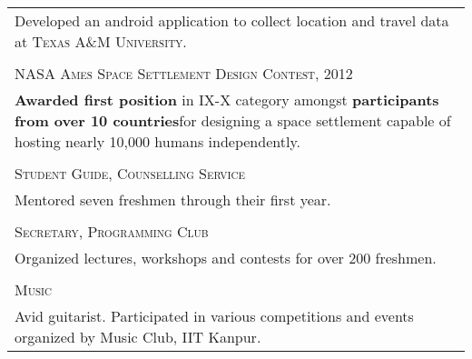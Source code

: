 \documentclass[a4paper,10pt]{article}
\begin{document}
\begin{longtable}{p{16cm}}
Developed an android application to collect location and travel data at \textsc{Texas A\&M University}. \\ \\
\large \textsc{NASA Ames Space Settlement Design Contest, 2012}\\
\textbf{Awarded first position} in IX-X category amongst \textbf{participants from over 10 countries}for designing a space settlement capable of hosting nearly 10,000 humans independently.\\ \\
\large \textsc{Student Guide, Counselling Service}\\
Mentored seven freshmen through their first year.\\ \\
\large \textsc{Secretary, Programming Club}\\
Organized lectures, workshops and contests for over 200 freshmen.
\\ \\
\large \textsc{Music}\\
Avid guitarist. Participated in various competitions and events organized by Music Club, IIT Kanpur.
\end{longtable}
\end{document}
